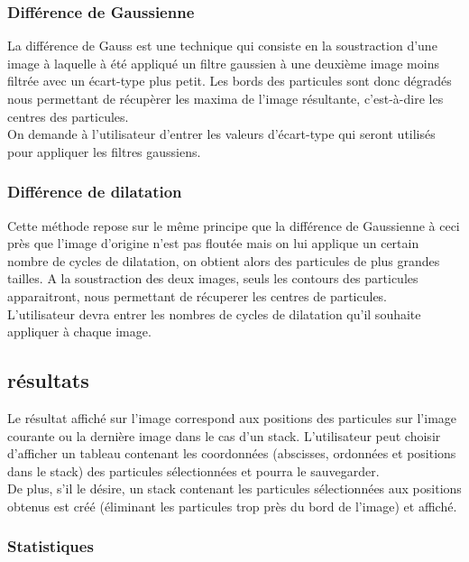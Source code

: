 \subsubsection{Différence de Gaussienne}
La différence de Gauss est une technique qui consiste en la soustraction d'une image à laquelle à été appliqué un filtre gaussien à une deuxième image moins filtrée avec un écart-type plus petit. Les bords des particules sont donc dégradés nous permettant de récupèrer les maxima de l'image résultante, c'est-à-dire les centres des particules.\\
\noindent
On demande à l'utilisateur d'entrer les valeurs d'écart-type qui seront utilisés pour appliquer les filtres gaussiens.

\subsubsection{Différence de dilatation}

Cette méthode repose sur le même principe que la différence de Gaussienne à ceci près que l'image d'origine n'est pas floutée mais on lui applique un certain nombre de cycles de dilatation, on obtient alors des particules de plus grandes tailles. A la soustraction des deux images, seuls les contours des particules apparaitront, nous permettant de récuperer les centres de particules.\\
L'utilisateur devra entrer les nombres de cycles de dilatation qu'il souhaite appliquer à chaque image.

\subsection{résultats}
Le résultat affiché sur l'image correspond aux positions des particules sur l'image courante ou la dernière image dans le cas d'un stack.
L'utilisateur peut choisir d'afficher un tableau contenant les coordonnées (abscisses, ordonnées et positions dans le stack) des particules sélectionnées et pourra le sauvegarder. \\
De plus, s'il le désire, un stack contenant les particules sélectionnées aux positions obtenus est créé (éliminant les particules trop près du bord de l'image) et affiché.

\subsubsection*{Statistiques}
